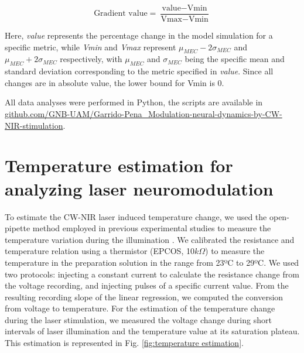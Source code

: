 \[\text{Gradient value} = \frac{\text{value} - \text{Vmin}}{\text{Vmax} - \text{Vmin}}\]

Here, \textit{value} represents the percentage change in the model simulation for a specific metric, while \textit{Vmin} and \textit{Vmax} represent $\mu_{MEC}-2\sigma_{MEC}$ and $\mu_{MEC}+2\sigma_{MEC}$ respectively, with $\mu_{MEC}$ and $\sigma_{MEC}$ being the specific mean and standard deviation corresponding to the metric specified in \textit{value}. Since all changes are in absolute value, the lower bound for Vmin is 0.

All data analyses were performed in Python, the scripts are available in \href{https://github.com/GNB-UAM/Garrido-Pena_Modulation-neural-dynamics-by-CW-NIR-stimulation}{github.com/GNB-UAM/Garrido-Pena\_Modulation-neural-dynamics-by-CW-NIR-stimulation}.


\section{Temperature estimation for analyzing laser neuromodulation}
\label{sec:temperature-estimation}
To estimate the CW-NIR laser induced temperature change, we used the open-pipette method employed in previous experimental studies to measure the temperature variation during the illumination \parencite{li_temporal_2013, rabbitt_heat_2016,brown_thermal_2020, brown_response_2021}. We calibrated the resistance and temperature relation using a thermistor (EPCOS, 10$k\Omega$) to measure the temperature in the preparation solution in the range from 23ºC to 29ºC. We used two protocols:  injecting a constant current to calculate the resistance change from the voltage recording, and injecting pulses of a specific current value. From the resulting recording slope of the linear regression, we computed the conversion from voltage to temperature. For the estimation of the temperature change during the laser stimulation, we measured the voltage change during short intervals of laser illumination and the temperature value at its saturation plateau. This estimation is represented in Fig. \ref{fig:temperature estimation}.



